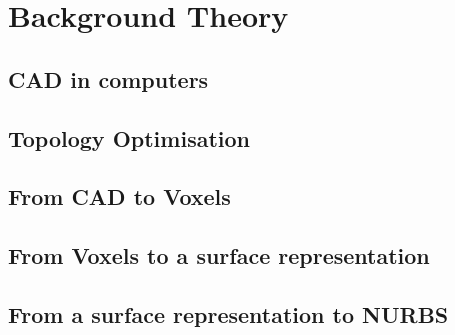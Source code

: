 \chapter{Background Theory}
\label{chapter:Background}

\section{CAD in computers}


\section{Topology Optimisation}


\section{From CAD to Voxels}


\section{From Voxels to a surface representation}


\section{From a surface representation to NURBS}



